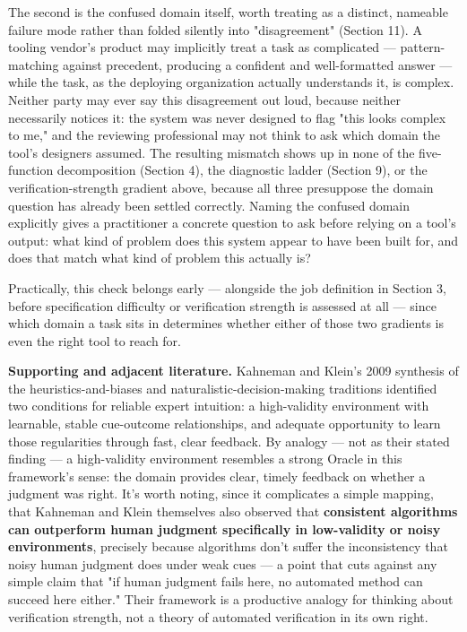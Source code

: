 The second is the confused domain itself, worth treating as a distinct, nameable failure mode rather than folded silently into "disagreement" (Section 11). A tooling vendor's product may implicitly treat a task as complicated --- pattern-matching against precedent, producing a confident and well-formatted answer --- while the task, as the deploying organization actually understands it, is complex. Neither party may ever say this disagreement out loud, because neither necessarily notices it: the system was never designed to flag "this looks complex to me," and the reviewing professional may not think to ask which domain the tool's designers assumed. The resulting mismatch shows up in none of the five-function decomposition (Section 4), the diagnostic ladder (Section 9), or the verification-strength gradient above, because all three presuppose the domain question has already been settled correctly. Naming the confused domain explicitly gives a practitioner a concrete question to ask before relying on a tool's output: what kind of problem does this system appear to have been built for, and does that match what kind of problem this actually is?

Practically, this check belongs early --- alongside the job definition in Section 3, before specification difficulty or verification strength is assessed at all --- since which domain a task sits in determines whether either of those two gradients is even the right tool to reach for.

\textbf{Supporting and adjacent literature.} Kahneman and Klein's 2009 synthesis of the heuristics-and-biases and naturalistic-decision-making traditions identified two conditions for reliable expert intuition: a high-validity environment with learnable, stable cue-outcome relationships, and adequate opportunity to learn those regularities through fast, clear feedback. By analogy --- not as their stated finding --- a high-validity environment resembles a strong Oracle in this framework's sense: the domain provides clear, timely feedback on whether a judgment was right. It's worth noting, since it complicates a simple mapping, that Kahneman and Klein themselves also observed that \textbf{consistent algorithms can outperform human judgment specifically in low-validity or noisy environments}, precisely because algorithms don't suffer the inconsistency that noisy human judgment does under weak cues --- a point that cuts against any simple claim that "if human judgment fails here, no automated method can succeed here either." Their framework is a productive analogy for thinking about verification strength, not a theory of automated verification in its own right.

